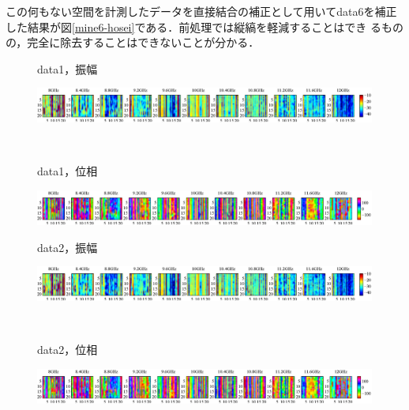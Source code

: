 ﻿\documentclass[12pt,oneside]{jsbook}
\begin{document}
この何もない空間を計測したデータを直接結合の補正として用いてdata6を補正
した結果が図\ref{mine6-hosei}である．前処理では縦縞を軽減することはでき
るものの，完全に除去することはできないことが分かる．
\begin{figure}[hbtp]
 \begin{center}
     \begin{minipage}[c]{0.19\hsize}
      data1，振幅
  \end{minipage}
     \begin{minipage}[c]{0.79\hsize}
\includegraphics[width = \hsize ]{20150204_mine1_raw_a.eps}
  \end{minipage}
\\
     \begin{minipage}[c]{0.19\hsize}
data1，位相
  \end{minipage}
     \begin{minipage}[c]{0.8\hsize}
\includegraphics[width =\hsize ]{20150204_mine1_raw_p.eps}
  \end{minipage}
\end{center}
\end{figure}
\begin{figure}[bhtp]
 \begin{center}
     \begin{minipage}[c]{0.19\hsize}
      data2，振幅
  \end{minipage}
     \begin{minipage}[c]{0.79\hsize}
\includegraphics[width = \hsize ]{20150204_mine2_raw_a.eps}
  \end{minipage}
\\
     \begin{minipage}[c]{0.19\hsize}
data2，位相
  \end{minipage}
     \begin{minipage}[c]{0.8\hsize}
\includegraphics[width =\hsize ]{20150204_mine2_raw_p.eps}
  \end{minipage}
\end{center}
\end{figure}
\end{document}
